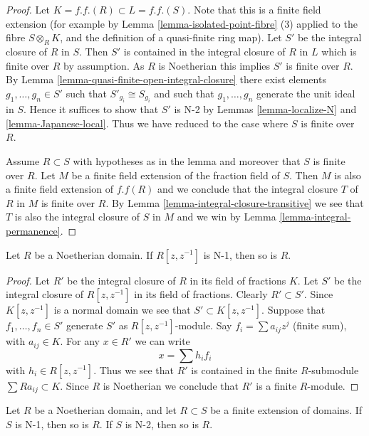\begin{proof}
Let $K = f.f.(R) \subset L = f.f.(S)$. Note that this is
a finite field extension (for example by
Lemma \ref{lemma-isolated-point-fibre} (3) applied
to the fibre $S \otimes_R K$, and the definition of a
quasi-finite ring map).
Let $S'$ be the integral closure of $R$ in $S$.
Then $S'$ is contained in the integral closure of $R$ in $L$
which is finite over $R$ by assumption. As $R$ is Noetherian this
implies $S'$ is finite over $R$.
By Lemma \ref{lemma-quasi-finite-open-integral-closure}
there exist elements $g_1, \ldots, g_n \in S'$
such that $S'_{g_i} \cong S_{g_i}$ and such that $g_1, \ldots, g_n$
generate the unit ideal in $S$. Hence it suffices to show that
$S'$ is N-2 by Lemmas \ref{lemma-localize-N} and \ref{lemma-Japanese-local}.
Thus we have reduced to the case where $S$ is finite over $R$.

\medskip\noindent
Assume $R \subset S$ with hypotheses as in the lemma and moreover
that $S$ is finite over $R$. Let $M$ be a finite field extension
of the fraction field of $S$. Then $M$ is also a finite field extension
of $f.f(R)$ and we conclude that the integral closure $T$ of $R$ in
$M$ is finite over $R$. By Lemma \ref{lemma-integral-closure-transitive}
we see that $T$ is also the integral closure of $S$ in $M$ and we win by
Lemma \ref{lemma-integral-permanence}.
\end{proof}

\begin{lemma}
\label{lemma-Laurent-ring-N-1}
Let $R$ be a Noetherian domain.
If $R[z, z^{-1}]$ is N-1, then so is $R$.
\end{lemma}

\begin{proof}
Let $R'$ be the integral closure of $R$ in its field of fractions $K$.
Let $S'$ be the integral closure of $R[z, z^{-1}]$ in its field of fractions.
Clearly $R' \subset S'$. 
Since $K[z, z^{-1}]$ is a normal domain we see that $S' \subset K[z, z^{-1}]$.
Suppose that $f_1, \ldots, f_n \in S'$ generate $S'$ as $R[z, z^{-1}]$-module.
Say $f_i = \sum a_{ij}z^j$ (finite sum), with $a_{ij} \in K$.
For any $x \in R'$ we can write
$$
x = \sum h_i f_i
$$
with $h_i \in R[z, z^{-1}]$. Thus we see that $R'$ is contained in the
finite $R$-submodule $\sum Ra_{ij} \subset K$. Since $R$ is Noetherian
we conclude that $R'$ is a finite $R$-module.
\end{proof}

\begin{lemma}
\label{lemma-finite-extesion-N-2}
Let $R$ be a Noetherian domain, and let $R \subset S$ be a
finite extension of domains. If $S$ is N-1, then so is $R$.
If $S$ is N-2, then so is $R$.
\end{lemma}

